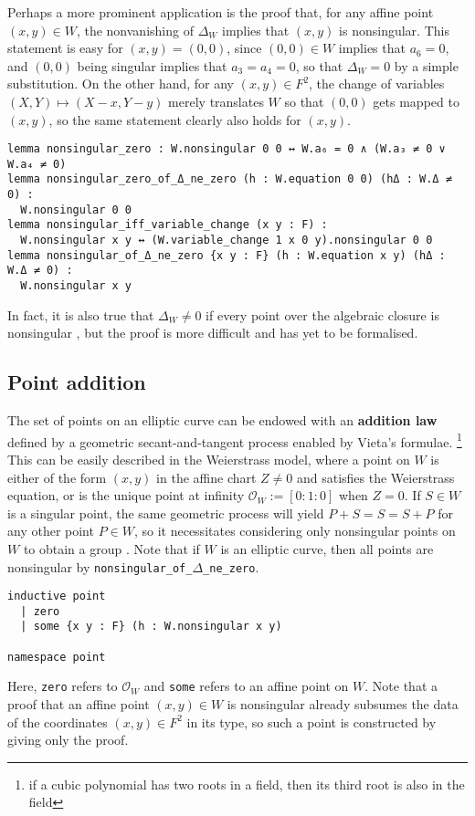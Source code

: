 \documentclass[a4paper,UKenglish,cleveref,autoref,thm-restate]{lipics-v2021}
\begin{document}
Perhaps a more prominent application is the proof that, for any affine point $ (x, y) \in W $, the nonvanishing of $ \Delta_W $ implies that $ (x, y) $ is nonsingular. This statement is easy for $ (x, y) = (0, 0) $, since $ (0, 0) \in W $ implies that $ a_6 = 0 $, and $ (0, 0) $ being singular implies that $ a_3 = a_4 = 0 $, so that $ \Delta_W = 0 $ by a simple substitution. On the other hand, for any $ (x, y) \in F^2 $, the change of variables $ (X, Y) \mapsto (X - x, Y - y) $ merely translates $ W $ so that $ (0, 0) $ gets mapped to $ (x, y) $, so the same statement clearly also holds for $ (x, y) $.
\begin{lstlisting}
lemma nonsingular_zero : W.nonsingular 0 0 ↔ W.a₆ = 0 ∧ (W.a₃ ≠ 0 ∨ W.a₄ ≠ 0)
lemma nonsingular_zero_of_Δ_ne_zero (h : W.equation 0 0) (hΔ : W.Δ ≠ 0) :
  W.nonsingular 0 0
lemma nonsingular_iff_variable_change (x y : F) :
  W.nonsingular x y ↔ (W.variable_change 1 x 0 y).nonsingular 0 0
lemma nonsingular_of_Δ_ne_zero {x y : F} (h : W.equation x y) (hΔ : W.Δ ≠ 0) :
  W.nonsingular x y
\end{lstlisting}

In fact, it is also true that $ \Delta_W \ne 0 $ if every point over the algebraic closure is nonsingular \cite[Proposition III.1.4]{silverman}, but the proof is more difficult and has yet to be formalised.

\pagebreak

\subsection{Point addition}

The set of points on an elliptic curve can be endowed with an \textbf{addition law} defined by a geometric secant-and-tangent process enabled by Vieta's formulae. \footnote{if a cubic polynomial has two roots in a field, then its third root is also in the field} This can be easily described in the Weierstrass model, where a point on $ W $ is either of the form $ (x, y) $ in the affine chart $ Z \ne 0 $ and satisfies the Weierstrass equation, or is the unique point at infinity $ \mathcal{O}_W := [0 : 1 : 0] $ when $ Z = 0 $. If $ S \in W $ is a singular point, the same geometric process will yield $ P + S = S = S + P $ for any other point $ P \in W $, so it necessitates considering only nonsingular points on $ W $ to obtain a group \cite[Section III.2]{silverman}. Note that if $ W $ is an elliptic curve, then all points are nonsingular by \texttt{nonsingular\_of\_\ensuremath{\Delta}\_ne\_zero}.
\begin{lstlisting}
inductive point
  | zero
  | some {x y : F} (h : W.nonsingular x y)

namespace point
\end{lstlisting}
Here, \texttt{zero} refers to $ \mathcal{O}_W $ and \texttt{some} refers to an affine point on $ W $. Note that a proof that an affine point $ (x, y) \in W $ is nonsingular already subsumes the data of the coordinates $ (x, y) \in F^2 $ in its type, so such a point is constructed by giving only the proof.
\end{document}
